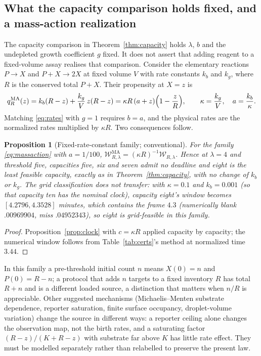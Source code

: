 \documentclass[11pt,a4paper]{article}
\theoremstyle{plain}
\newtheorem{proposition}[theorem]{Proposition}
\theoremstyle{definition}
\theoremstyle{remark}
\newcommand{\Wc}{\mathcal W}
\begin{document}
\subsection{What the capacity comparison holds fixed, and a mass-action realization}\label{sec:massaction}
The capacity comparison in Theorem~\ref{thm:capacity} holds $\lambda$, $b$ and the undepleted growth coefficient $g$ fixed. It does not assert that adding reagent to a fixed-volume assay realises that comparison. Consider the elementary reactions $P\to X$ and $P+X\to2X$ at fixed volume $V$ with rate constants $k_b$ and $k_g$, where $R$ is the conserved total $P+X$. Their propensity at $X=z$ is
\begin{equation}\label{eq:massaction}
q^{\mathrm{MA}}_R(z)=k_b(R-z)+\frac{k_g}{V}\,z(R-z)=\kappa R\,(a+z)\Bigl(1-\frac zR\Bigr),\qquad \kappa=\frac{k_g}{V},\quad a=\frac{k_b}{\kappa}.
\end{equation}
Matching \eqref{eq:rates} with $g=1$ requires $b=a$, and the physical rates are the normalized rates multiplied by $\kappa R$. Two consequences follow.

\begin{proposition}[Fixed-rate-constant family; conventional]\label{prop:massaction}
For the family \eqref{eq:massaction} with $a=1/100$, $\Wc^{\mathrm{MA}}_{R,\lambda}=(\kappa R)^{-1}\Wc_{R,\lambda}$. Hence at $\lambda=4$ and threshold five, capacities five, six and seven admit no deadline and eight is the least feasible capacity, exactly as in Theorem~\ref{thm:capacity}, with no change of $k_b$ or $k_g$. The grid classification does not transfer: with $\kappa=0.1$ and $k_b=0.001$ (so that capacity ten has the nominal clock), capacity eight's window becomes $[4.2796,4.3528]$ minutes, which contains the frame $4.3$ (numerically blank $.00969904$, miss $.04952343$), so eight is grid-feasible in this family.
\end{proposition}
\begin{proof}
Proposition~\ref{prop:clock} with $c=\kappa R$ applied capacity by capacity; the numerical window follows from Table~\ref{tab:certs}'s method at normalized time $3.44$.
\end{proof}
In this family a pre-threshold initial count $n$ means $X(0)=n$ and $P(0)=R-n$; a protocol that adds $n$ targets to a fixed inventory $R$ has total $R+n$ and is a different loaded source, a distinction that matters when $n/R$ is appreciable. Other suggested mechanisms (Michaelis--Menten substrate dependence, reporter saturation, finite surface occupancy, droplet-volume variation) change the source in different ways: a reporter ceiling alone changes the observation map, not the birth rates, and a saturating factor $(R-z)/(K+R-z)$ with substrate far above $K$ has little rate effect. They must be modelled separately rather than relabelled to preserve the present law.
\end{document}
